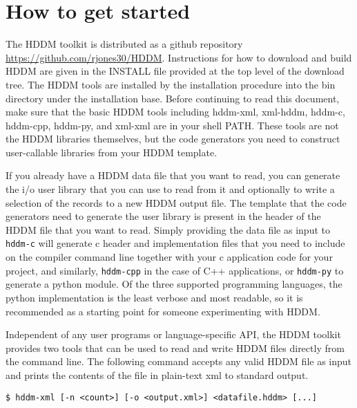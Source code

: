 \documentclass{revtex4}
\begin{document}
\section{How to get started}

The HDDM toolkit is distributed as a github repository \url{https://github.com/rjones30/HDDM}.
Instructions for how to download and build HDDM are given in the INSTALL file
provided at the top level of the download tree. The HDDM tools are installed
by the installation procedure into the bin directory under the installation
base. Before continuing to read this document, make sure that the basic HDDM tools
including hddm-{}xml, xml-{}hddm, hddm-{}c, hddm-{}cpp, hddm-{}py, and xml-{}xml
are in your shell PATH. These tools are not the HDDM libraries themselves, but
the code generators you need to construct user-callable libraries from your 
HDDM template.

If you already have a HDDM data file that you want to read, you can generate
the i/o user library that you can use to read from it and optionally to write
a selection of the records to a new HDDM output file. The template that the
code generators need to generate the user library is present in the header of
the HDDM file that you want to read. Simply providing the data file as input
to \texttt{hddm-c} will generate c header and implementation files that you
need to include on the compiler command line together with your c application
code for your project, and similarly, \texttt{hddm-cpp} in the case of C++
applications, or \texttt{hddm-py} to generate a python module. Of the three
supported programming languages, the python implementation is the least
verbose and most readable, so it is recommended as a starting point for
someone experimenting with HDDM.

Independent of any user programs or language-{}specific API, the HDDM toolkit
provides two tools that can be used to read and write HDDM files directly from
the command line. The following command accepts any valid HDDM file as input
and prints the contents of the file in plain-{}text xml to standard output.

\vspace{0.5cm}
\begin{minipage}{12cm}
\begin{verbatim}
$ hddm-xml [-n <count>] [-o <output.xml>] <datafile.hddm> [...]
\end{verbatim}
\end{minipage}
\vspace{0.5cm}
\end{document}
